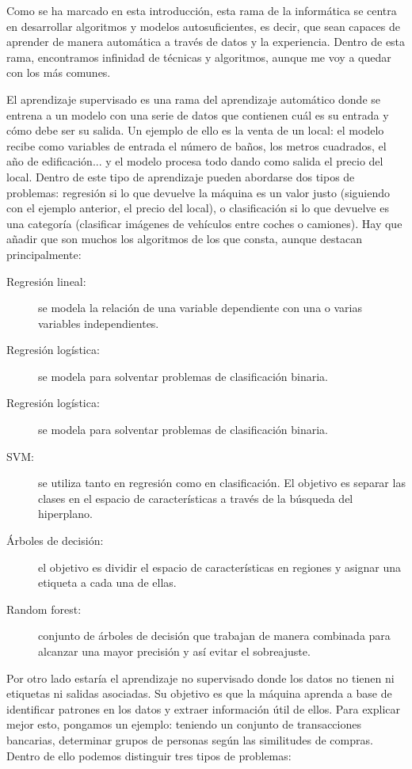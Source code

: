 	Como se ha marcado en esta introducción, esta rama de la informática se centra en desarrollar algoritmos y modelos autosuficientes, es decir, que sean capaces de aprender de manera automática a través de datos y la experiencia. Dentro de esta rama, encontramos infinidad de técnicas y algoritmos, aunque me voy a quedar con los más comunes.
	
	El aprendizaje supervisado es una rama del aprendizaje automático donde se entrena a un modelo con una serie de datos que contienen cuál es su entrada y cómo debe ser su salida. Un ejemplo de ello es la venta de un local: el modelo recibe como variables de entrada el número de baños, los metros cuadrados, el año de edificación... y el modelo procesa todo dando como salida el precio del local. Dentro de este tipo de aprendizaje pueden abordarse dos tipos de problemas: regresión si lo que devuelve la máquina es un valor justo (siguiendo con el ejemplo anterior, el precio del local), o clasificación si lo que devuelve es una categoría (clasificar imágenes de vehículos entre coches o camiones). Hay que añadir que son muchos los algoritmos de los que consta, aunque destacan principalmente:
	
\begin{description}
	\item[Regresión lineal:] se modela la relación de una variable dependiente con una o varias variables independientes.
	\item[Regresión logística:] se modela para solventar problemas de clasificación binaria.
	\item[Regresión logística:] se modela para solventar problemas de clasificación binaria.
	\item[SVM:] se utiliza tanto en regresión como en clasificación. El objetivo es separar las clases en el espacio de características a través de la búsqueda del hiperplano.
	\item[Árboles de decisión:] el objetivo es dividir el espacio de características en regiones y asignar una etiqueta a cada una de ellas.
	\item[Random forest:] conjunto de árboles de decisión que trabajan de manera combinada para alcanzar una mayor precisión y así evitar el sobreajuste.
\end{description}

	Por otro lado estaría el aprendizaje no supervisado donde los datos no tienen ni etiquetas ni salidas asociadas. Su objetivo es que la máquina aprenda a base de identificar patrones en los datos y extraer información útil de ellos. Para explicar mejor esto, pongamos un ejemplo: teniendo un conjunto de transacciones bancarias, determinar grupos de personas según las similitudes de compras. Dentro de ello podemos distinguir tres tipos de problemas:
	
